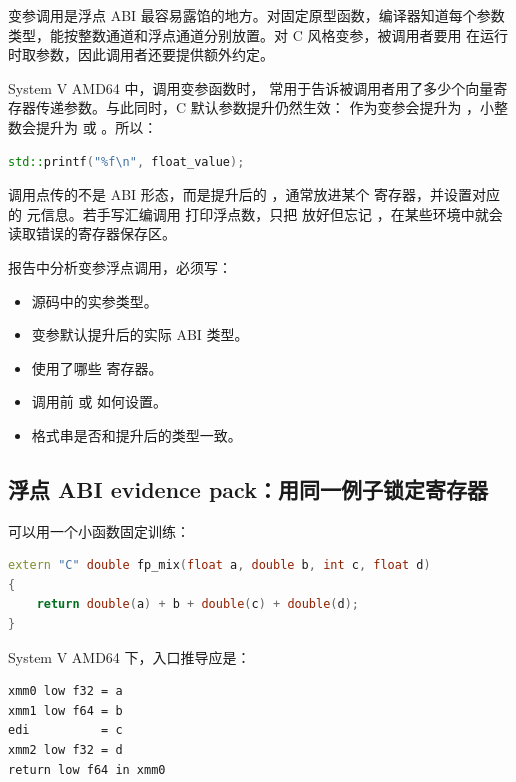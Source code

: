 变参调用是浮点 ABI 最容易露馅的地方。对固定原型函数，编译器知道每个参数类型，能按整数通道和浮点通道分别放置。对 C 风格变参，被调用者要用  在运行时取参数，因此调用者还要提供额外约定。

System V AMD64 中，调用变参函数时， 常用于告诉被调用者用了多少个向量寄存器传递参数。与此同时，C 默认参数提升仍然生效： 作为变参会提升为 ，小整数会提升为  或 。所以：

\begin{lstlisting}[language=C++]
std::printf("%f\n", float_value);
\end{lstlisting}

调用点传的不是  ABI 形态，而是提升后的 ，通常放进某个  寄存器，并设置对应的  元信息。若手写汇编调用  打印浮点数，只把  放好但忘记 ，在某些环境中就会读取错误的寄存器保存区。

报告中分析变参浮点调用，必须写：

\begin{itemize}
  \item 源码中的实参类型。
  \item 变参默认提升后的实际 ABI 类型。
  \item 使用了哪些  寄存器。
  \item 调用前  或  如何设置。
  \item 格式串是否和提升后的类型一致。
\end{itemize}

\subsection{浮点 ABI evidence pack：用同一例子锁定寄存器}

可以用一个小函数固定训练：

\begin{lstlisting}[language=C++,caption={浮点和整数混合 ABI 样例}]
extern "C" double fp_mix(float a, double b, int c, float d)
{
    return double(a) + b + double(c) + double(d);
}
\end{lstlisting}

System V AMD64 下，入口推导应是：

\begin{lstlisting}[numbers=none,caption={fp\_mix 的入口状态}]
xmm0 low f32 = a
xmm1 low f64 = b
edi          = c
xmm2 low f32 = d
return low f64 in xmm0
\end{lstlisting}

